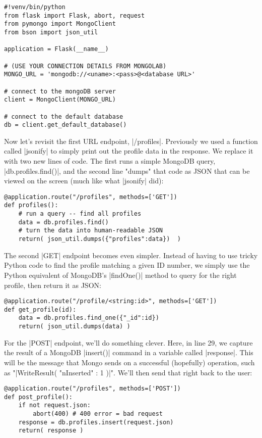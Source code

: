 \documentclass[11pt]{book}
\begin{document}
\begin{verbatim}
#!venv/bin/python
from flask import Flask, abort, request
from pymongo import MongoClient
from bson import json_util

application = Flask(__name__)

# (USE YOUR CONNECTION DETAILS FROM MONGOLAB)
MONGO_URL = 'mongodb://<uname>:<pass>@<database URL>'

# connect to the mongoDB server
client = MongoClient(MONGO_URL) 

# connect to the default database 
db = client.get_default_database()
\end{verbatim}

Now let's revisit the first URL endpoint, |/profiles|.  Previously we used a function called |jsonify| to simply print out the profile data in the response.  We replace it with two new lines of code.  The first runs a simple MongoDB query, |db.profiles.find()|, and the second line "dumps" that code as JSON that can be viewed on the screen (much like what |jsonify| did):

\begin{verbatim}
@application.route("/profiles", methods=['GET'])
def profiles():
    # run a query -- find all profiles
    data = db.profiles.find()
    # turn the data into human-readable JSON
    return( json_util.dumps({"profiles":data})  )
\end{verbatim}

The second |GET| endpoint becomes even simpler.  Instead of having to use tricky Python code to find the profile matching a given ID number, we simply use the Python equivalent of MongoDB's |findOne()| method to query for the right profile, then return it as JSON:

\begin{verbatim}
@application.route("/profile/<string:id>", methods=['GET'])
def get_profile(id):
    data = db.profiles.find_one({"_id":id})
    return( json_util.dumps(data) )
\end{verbatim}

For the |POST| endpoint, we'll do something clever.  Here, in line 29, we capture the result of a MongoDB |insert()| command in a variable called |response|.  This will be the message that Mongo sends on a successful (hopefully) operation, such as "|WriteResult({ "nInserted" : 1 })|".  We'll then send that right back to the user:

\begin{verbatim}
@application.route("/profiles", methods=['POST'])
def post_profile():
    if not request.json:
        abort(400) # 400 error = bad request
    response = db.profiles.insert(request.json)
    return( response )
\end{verbatim}
\end{document}
